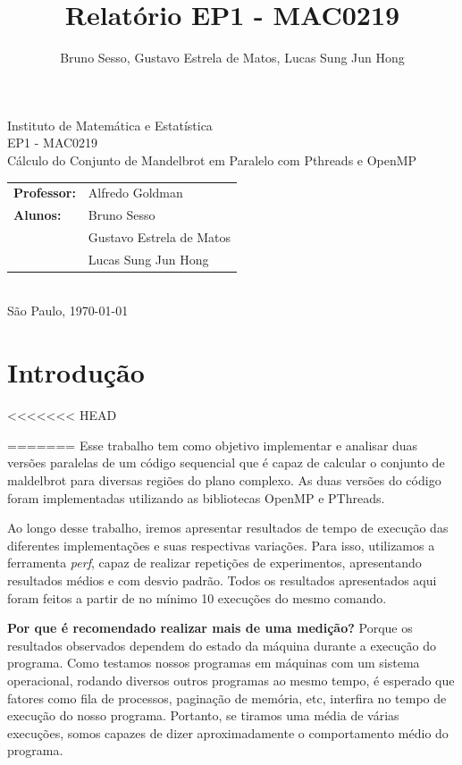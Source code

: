 \documentclass[12pt]{article}
\title{Relatório EP1 - MAC0219}
\author{Bruno Sesso, Gustavo Estrela de Matos, Lucas Sung Jun Hong}
\begin{document}
\doublespacing
\begin{titlepage}
    \vfill
    \begin{center}
        \vspace{0.5\textheight}
        \noindent
        Instituto de Matemática e Estatística \\
        EP1 - MAC0219 \\
        \vfill
        \noindent
        {\Large Cálculo do Conjunto de Mandelbrot
        em Paralelo com Pthreads e OpenMP} \\
        \bigskip
        \bigskip
        \begin{tabular}{ll}
            {\bf Professor:} & {Alfredo Goldman} \\
            {\bf Alunos:}    & {Bruno Sesso} \\
                             & {Gustavo Estrela de Matos} \\
                             & {Lucas Sung Jun Hong} \\
        \end{tabular} \\
        \vspace{\fill}
       \bigskip
        São Paulo, \today \\
       \bigskip
    \end{center}
\end{titlepage}

\pagebreak
\tableofcontents
\pagebreak

\newpage
\section{Introdução}
<<<<<<< HEAD
\newpage

\newpage
=======
Esse trabalho tem como objetivo implementar e analisar duas versões
paralelas de um código sequencial que é capaz de calcular o conjunto de
maldelbrot para diversas regiões do plano complexo. As duas versões do
código foram implementadas utilizando as bibliotecas OpenMP e PThreads.

Ao longo desse trabalho, iremos apresentar resultados de tempo de 
execução das diferentes implementações e suas respectivas variações.
Para isso, utilizamos a ferramenta {\em perf}, capaz de realizar 
repetições de experimentos, apresentando resultados médios e com desvio
padrão. Todos os resultados apresentados aqui foram feitos a partir de
no mínimo 10 execuções do mesmo comando.


    {\bf Por que é recomendado realizar mais de uma medição?} 
        Porque os resultados observados dependem do estado da máquina
        durante a execução do programa. Como testamos nossos programas
        em máquinas com um sistema operacional, rodando diversos outros
        programas ao mesmo tempo, é esperado que fatores como fila de
        processos, paginação de memória, etc, interfira no tempo de 
        execução do nosso programa. Portanto, se tiramos uma média
        de várias execuções, somos capazes de dizer aproximadamente
        o comportamento médio do programa.
\end{document}
